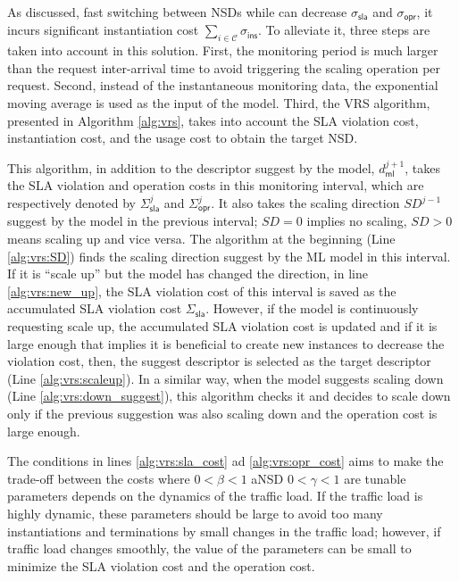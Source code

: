 \documentclass[conference, final]{IEEEtran}
\begin{document}
{As discussed, fast switching between NSDs while can decrease $\sigma_{\textsf{sla}}$ and $\sigma_{\textsf{opr}}$, it incurs significant instantiation cost $\sum_{i \in \mathcal{C}}{\sigma_{\textsf{ins}}}$. To alleviate it, three steps are taken into account in this solution. First, the monitoring period is much larger than the request inter-arrival time to avoid triggering the scaling operation per request. Second, instead of the instantaneous monitoring data, the exponential moving average is used as the input of the model. Third, the VRS algorithm, presented in Algorithm \ref{alg:vrs}, takes into account the SLA violation cost, instantiation cost, and the usage cost to obtain the target NSD. 

This algorithm, in addition to the descriptor suggest by the model, $d^{j+1}_{\textsf{ml}}$, takes the SLA violation and operation costs in this monitoring interval, which are respectively denoted by $\Sigma^{j}_{\textsf{sla}}$ and $\Sigma^{j}_{\textsf{opr}}$. It also takes the scaling direction $SD^{j-1}$ suggest by the model in the previous interval; $SD = 0$ implies no scaling, $SD > 0$ means scaling up and vice versa. The algorithm at the beginning (Line \ref{alg:vrs:SD}) finds the scaling direction suggest by the ML model in this interval. If it is ``scale up'' but the model has changed the direction, in line \ref{alg:vrs:new_up}, the SLA violation cost of this interval is saved as the accumulated SLA violation cost $\Sigma_{\textsf{sla}}$. However, if the model is continuously requesting scale up, the accumulated SLA violation cost is updated and if it is large enough that implies it is beneficial to create new instances to decrease the violation cost, then, the suggest descriptor is selected as the target descriptor (Line \ref{alg:vrs:scaleup}). In a similar way, when the model suggests scaling down (Line \ref{alg:vrs:down_suggest}), this algorithm checks it and decides to scale down only if the previous suggestion was also scaling down and the operation cost is large enough. 

The conditions in lines \ref{alg:vrs:sla_cost} ad \ref{alg:vrs:opr_cost} aims to make the trade-off between the costs where $0 < \beta <1$ aNSD $0< \gamma <1$ are tunable parameters depends on the dynamics of the traffic load. If the traffic load is highly dynamic, these parameters should be large to avoid too many instantiations and terminations by small changes in the traffic load; however, if traffic load changes smoothly, the value of the parameters can be small to minimize the SLA violation cost and the operation cost.

}
\end{document}
